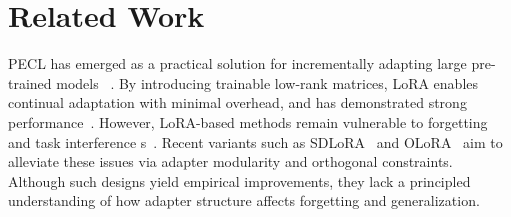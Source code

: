 \documentclass[10pt]{article} %
\newcommand{\minisection}[1]{\vspace{0.04in}\noindent{\bf #1}}
\begin{document}

\section{Related Work}

\minisection{LoRA-Based CL.}
PECL has emerged as a practical solution for incrementally adapting large pre-trained models
~\cite{pmlr-v97-houlsby19a,Wang_2022_CVPR,dingParameterefficientFinetuningLargescale2023,xu2023parameterefficientfinetuningmethodspretrained}. By introducing trainable low-rank matrices, LoRA enables continual adaptation with minimal overhead, and has demonstrated strong performance~\cite{hu2022lora}.
However, LoRA-based methods remain vulnerable to forgetting and task interference
s~\cite{Gao_2023_ICCV,10.1145/3730436.3730456,yang2024parametercollisionhinderingcontinual}. 
Recent variants such as SDLoRA~\cite{wu2025sdlorascalabledecoupledlowrank} and OLoRA~\cite{NEURIPS2020_70d85f35,wang2023orthogonal} aim to alleviate these issues via adapter modularity and orthogonal constraints. 
Although such designs yield empirical improvements, they lack a principled understanding of how adapter structure affects forgetting and generalization.
\end{document}
